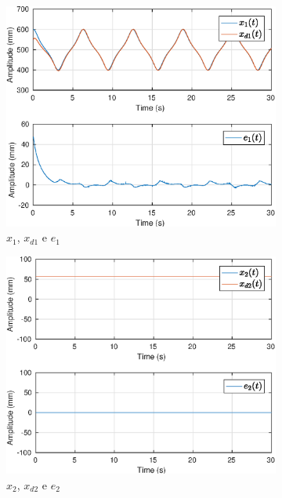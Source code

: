 \begin{figure}[H]
\centering
\begin{subfigure}{.5\textwidth}
  \centering
  \includegraphics[width=\linewidth]{./img/traj_2_k1/x1.eps}
  \caption{$x_1$, $x_{d1}$ e $e_1$}
  \label{fig:sub1}
\end{subfigure}%
\begin{subfigure}{.5\textwidth}
  \centering
  \includegraphics[width=\linewidth]{./img/traj_2_k1/x2.eps}
  \caption{$x_2$, $x_{d2}$ e $e_2$}
  \label{fig:sub2}
\end{subfigure}
\begin{subfigure}{.5\textwidth}

\end{subfigure}
\end{figure}
